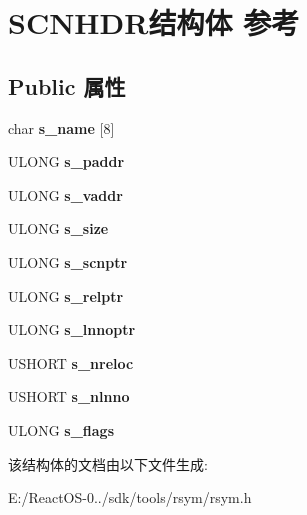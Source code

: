 \hypertarget{struct_s_c_n_h_d_r}{}\section{S\+C\+N\+H\+D\+R结构体 参考}
\label{struct_s_c_n_h_d_r}
\subsection*{Public 属性}
\begin{DoxyCompactItemize}
\item 
\mbox{\label{struct_s_c_n_h_d_r_ab143049d46988bddddc671ed511a2b26}} 
char {\bfseries s\+\_\+name} \mbox{[}8\mbox{]}
\item 
\mbox{\label{struct_s_c_n_h_d_r_a3a168b1c008bf2da07383330d6e6e93f}} 
U\+L\+O\+NG {\bfseries s\+\_\+paddr}
\item 
\mbox{\label{struct_s_c_n_h_d_r_a2870236db185c5a375fd99d0d469f1e6}} 
U\+L\+O\+NG {\bfseries s\+\_\+vaddr}
\item 
\mbox{\label{struct_s_c_n_h_d_r_a4973029d5156ecf5e6a4c1782aee1f89}} 
U\+L\+O\+NG {\bfseries s\+\_\+size}
\item 
\mbox{\label{struct_s_c_n_h_d_r_a10f54fea41fabd839cc469f6727a2e6d}} 
U\+L\+O\+NG {\bfseries s\+\_\+scnptr}
\item 
\mbox{\label{struct_s_c_n_h_d_r_adce5a41bab3d22353bb1165530112b5c}} 
U\+L\+O\+NG {\bfseries s\+\_\+relptr}
\item 
\mbox{\label{struct_s_c_n_h_d_r_a6c1eb5ae9926d8c9df84a9bbd7b3ecc9}} 
U\+L\+O\+NG {\bfseries s\+\_\+lnnoptr}
\item 
\mbox{\label{struct_s_c_n_h_d_r_aec0cca05711c3587d1a1d2357a765d31}} 
U\+S\+H\+O\+RT {\bfseries s\+\_\+nreloc}
\item 
\mbox{\label{struct_s_c_n_h_d_r_aa6a15e2da2861f77336f2056410362a9}} 
U\+S\+H\+O\+RT {\bfseries s\+\_\+nlnno}
\item 
\mbox{\label{struct_s_c_n_h_d_r_aee3be275f606194f9c572aa8f0734734}} 
U\+L\+O\+NG {\bfseries s\+\_\+flags}
\end{DoxyCompactItemize}


该结构体的文档由以下文件生成\+:\begin{DoxyCompactItemize}
\item 
E\+:/\+React\+O\+S-\/0../sdk/tools/rsym/rsym.\+h\end{DoxyCompactItemize}
